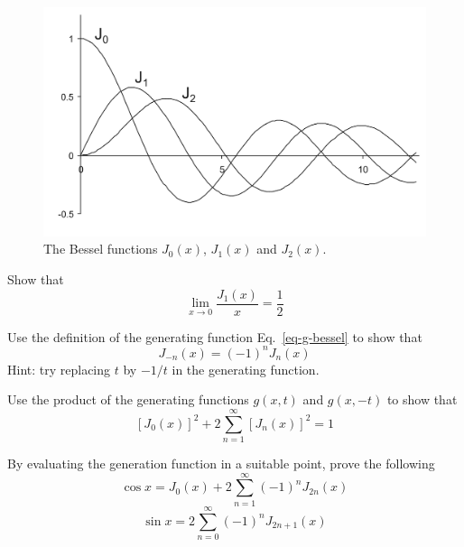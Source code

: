 \begin{figure}
\centering
\includegraphics[scale=0.7]{special/figures/j}
\caption{The Bessel functions $J_0(x)$, $J_1(x)$ and $J_2(x)$.}
\label{fig-bessel-J}
\end{figure}

\begin{sidebar}
\begin{ex}
Show that
$$\lim_{x \to 0} \frac{J_1(x)}{x}= \frac{1}{2}$$
\end{ex}
\end{sidebar}

\begin{sidebar}
\begin{ex}
Use the definition of the generating function Eq.~\ref{eq-g-bessel} to show that
$$J_{-n}(x)=(-1)^nJ _n(x)$$
Hint: try replacing $t$ by $-1/t$ in the generating function.
\end{ex}
\end{sidebar}

\begin{sidebar}
\begin{ex}
Use the product of the generating functions $g(x,t)$ and $g(x,-t)$ to show that
$$\left[ J_0(x) \right]^2 + 2 \sum_{n=1}^\infty \left[ J_n(x) \right]^2 = 1 $$
\end{ex}
\end{sidebar}

\begin{sidebar}
\begin{ex}
By evaluating the generation function in a suitable point, prove the following
$$ \cos x =  J_0(x) + 2 \sum_{n=1}^\infty (-1)^n J_{2n}(x)  $$
$$ \sin x =  2 \sum_{n=0}^\infty (-1)^n J_{2n+1}(x)  $$
\end{ex}
\end{sidebar}

